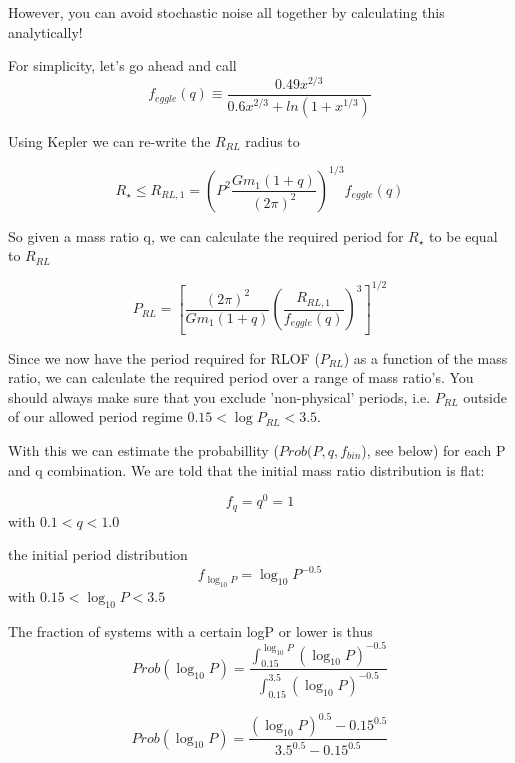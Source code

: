 \documentclass[11pt]{article}
\begin{document}
However, you can avoid stochastic noise all together by calculating this analytically!

For simplicity, let's go ahead and call 
\begin{equation}
f_{eggle}(q) \equiv \frac{0.49 x^{2/3}}{0.6 x^{2/3} + ln(1 + x^{1/3})}
\end{equation}

Using Kepler we can re-write the  $R_{RL}$ radius to

\begin{equation}
 R_{\star} \leq R_{RL,1} = \left( P^2 \frac{G m_1(1+q)}{(2\pi)^2} \right)^{1/3} f_{eggle}(q) \end{equation}


So given a mass ratio q, we can calculate the required period for $R_{\star}$ to be equal to $R_{RL}$

\begin{equation}
 P_{RL}   = \left[  \frac{(2\pi)^2}{G m_1(1+q)} \left(\frac{R_{RL,1}}{f_{eggle}(q)}\right)^{3} \right]^{1/2}
 \label{eq:PRL}
\end{equation}

Since we now have the period required for RLOF ($P_{RL}$) as a function of the mass ratio, we can calculate the required period over a range of mass ratio's. You should always make sure that you exclude 'non-physical' periods, i.e. $P_{RL}$ outside of our allowed period regime $0.15 < \log P_{RL}< 3.5$.

With this we can estimate the probabillity ($Prob(P,q, f_{bin}$), see below) for each P and q combination. 
We are told that the initial mass ratio distribution is flat:

\begin{equation}
f_{q} = q^0 = 1
\end{equation}
with $0.1<q<1.0$

the initial period distribution 
\begin{equation}
f_{\log_{10} P} = \log_{10} P^{-0.5}
\end{equation}
with $0.15 < \log_{10} P< 3.5$

The fraction of systems with a certain logP or lower is thus
\begin{equation}
Prob(\log_{10} P) = \frac{ \int_{0.15}^{\log_{10}P} (\log_{10} P)^{-0.5} }{\int_{0.15}^{3.5} (\log_{10} P)^{-0.5}}
\end{equation}

\begin{equation}
Prob(\log_{10} P) = \frac{ (\log_{10} P)^{0.5} - 0.15^{0.5} }{ 3.5^{0.5} - 0.15^{0.5} }
\end{equation}
\end{document}
